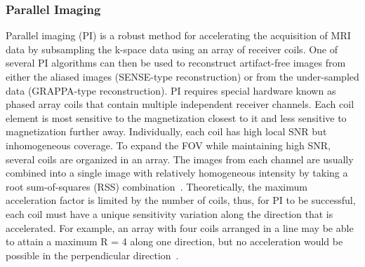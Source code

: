 \subsubsection{Parallel Imaging}
Parallel imaging (PI) is a robust method for accelerating the acquisition of MRI data by subsampling the k-space data using an array of receiver coils. One of several PI algorithms can then be used to reconstruct artifact-free images from either the aliased images (SENSE-type reconstruction) or from the under-sampled data (GRAPPA-type reconstruction). PI requires special hardware known as phased array coils that 
contain multiple independent receiver channels. Each coil element is most sensitive to the magnetization closest to it and less sensitive to magnetization further away. 
Individually, each coil has high local SNR but inhomogeneous coverage. To expand the FOV while maintaining high SNR, several coils are organized in an array. The images from each channel are usually combined into a single image with relatively homogeneous intensity by taking a root sum-of-squares (RSS) combination~\cite{DeepMRIReconstructionSubsampling}.
Theoretically, the maximum acceleration factor is limited by the number of coils, 
thus, for PI to be successful, each coil must have a unique sensitivity variation along the direction that is accelerated. For example, an array with four coils arranged in a line may be able to attain a maximum R = 4 along one direction, but no acceleration would be possible in the perpendicular direction~\cite{AdvancesPI}.\\
